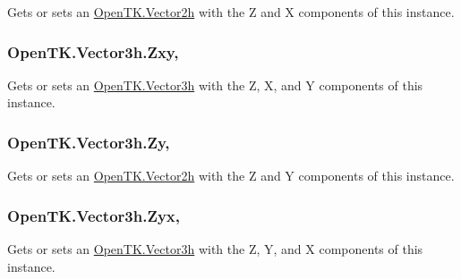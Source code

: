 Gets or sets an \hyperlink{struct_open_t_k_1_1_vector2h}{Open\-T\-K.\-Vector2h} with the Z and X components of this instance. 

\hypertarget{struct_open_t_k_1_1_vector3h_a7716c49ef72d22feda5d6f372d28c57b}{
\subsubsection[{Zxy}]{ Open\-T\-K.\-Vector3h.\-Zxy\hspace{0.3cm}{\ttfamily [get]}, {\ttfamily [set]}}}\label{struct_open_t_k_1_1_vector3h_a7716c49ef72d22feda5d6f372d28c57b}


Gets or sets an \hyperlink{struct_open_t_k_1_1_vector3h}{Open\-T\-K.\-Vector3h} with the Z, X, and Y components of this instance. 

\hypertarget{struct_open_t_k_1_1_vector3h_a8b56a3387db80c5ef53ab06ebee62b55}{
\subsubsection[{Zy}]{ Open\-T\-K.\-Vector3h.\-Zy\hspace{0.3cm}{\ttfamily [get]}, {\ttfamily [set]}}}\label{struct_open_t_k_1_1_vector3h_a8b56a3387db80c5ef53ab06ebee62b55}


Gets or sets an \hyperlink{struct_open_t_k_1_1_vector2h}{Open\-T\-K.\-Vector2h} with the Z and Y components of this instance. 

\hypertarget{struct_open_t_k_1_1_vector3h_a484f9fd6b2027bf42e2ebfffe46364e7}{
\subsubsection[{Zyx}]{ Open\-T\-K.\-Vector3h.\-Zyx\hspace{0.3cm}{\ttfamily [get]}, {\ttfamily [set]}}}\label{struct_open_t_k_1_1_vector3h_a484f9fd6b2027bf42e2ebfffe46364e7}


Gets or sets an \hyperlink{struct_open_t_k_1_1_vector3h}{Open\-T\-K.\-Vector3h} with the Z, Y, and X components of this instance. 

